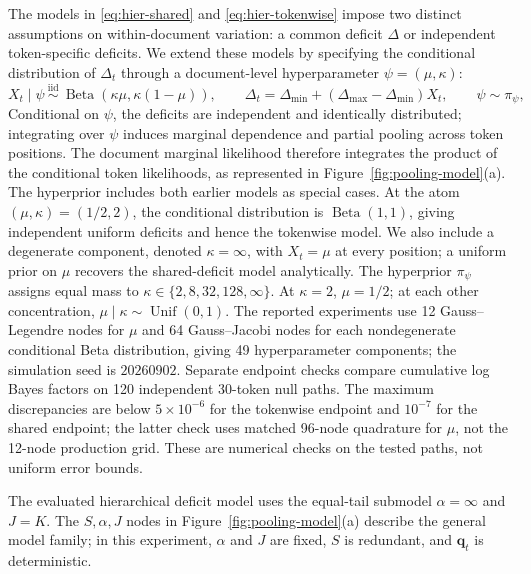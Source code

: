 \documentclass[11pt]{article}
\newcommand{\Unif}{\operatorname{Unif}}
\begin{document}
The models in \eqref{eq:hier-shared} and \eqref{eq:hier-tokenwise} impose two
distinct assumptions on within-document variation: a common deficit $\Delta$ or
independent token-specific deficits.  We extend these models by specifying the
conditional distribution of $\Delta_t$ through a document-level hyperparameter
$\psi=(\mu,\kappa)$:
\begin{equation}
  X_t\mid\psi\ \stackrel{\mathrm{iid}}{\sim}\ \operatorname{Beta}(\kappa\mu,\kappa(1-\mu)),\qquad
  \Delta_t=\Delta_{\min}+(\Delta_{\max}-\Delta_{\min})X_t,\qquad \psi\sim\pi_\psi,
  \label{eq:deficit-pooling}
\end{equation}
Conditional on $\psi$, the deficits are independent and identically distributed;
integrating over $\psi$ induces marginal dependence and partial pooling across
token positions.  The document marginal likelihood therefore integrates the
product of the conditional token likelihoods, as represented in
Figure~\ref{fig:pooling-model}(a).  The hyperprior includes both earlier models as
special cases.  At the atom $(\mu,\kappa)=(1/2,2)$, the conditional distribution is
$\operatorname{Beta}(1,1)$, giving independent uniform deficits and hence the
tokenwise model.  We also include a degenerate component, denoted
$\kappa=\infty$, with $X_t=\mu$ at every position; a uniform prior on $\mu$
recovers the shared-deficit model analytically.
The hyperprior $\pi_\psi$ assigns equal mass to
$\kappa\in\{2,8,32,128,\infty\}$.  At $\kappa=2$, $\mu=1/2$; at each other
concentration, $\mu\mid\kappa\sim\Unif(0,1)$.
The reported experiments use 12 Gauss--Legendre nodes for $\mu$ and 64
Gauss--Jacobi nodes for each nondegenerate conditional Beta distribution, giving
49 hyperparameter components; the simulation seed is $20260902$.
Separate endpoint checks compare cumulative log Bayes factors on 120 independent
30-token null paths.  The maximum discrepancies are below $5\times10^{-6}$ for
the tokenwise endpoint and $10^{-7}$ for the shared endpoint; the latter check
uses matched 96-node quadrature for $\mu$, not the 12-node production grid.
These are numerical checks on the tested paths, not uniform error bounds.

The evaluated hierarchical deficit model
uses the equal-tail submodel $\alpha=\infty$ and $J=K$.  The $S,\alpha,J$ nodes in
Figure~\ref{fig:pooling-model}(a) describe the general model family; in this
experiment, $\alpha$ and $J$ are fixed, $S$ is redundant, and $\bm q_t$ is deterministic.
\end{document}
